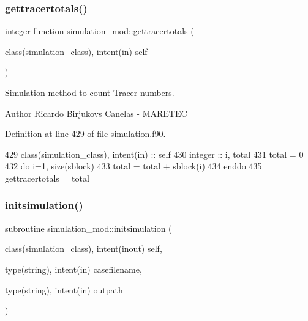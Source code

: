 \subsubsection{\texorpdfstring{gettracertotals()}{gettracertotals()}}
{\footnotesize\ttfamily integer function simulation\+\_\+mod\+::gettracertotals (\begin{DoxyParamCaption}\item[{class(\mbox{\hyperlink{structsimulation__mod_1_1simulation__class}{simulation\+\_\+class}}), intent(in)}]{self }\end{DoxyParamCaption})\hspace{0.3cm}{\ttfamily [private]}}



Simulation method to count Tracer numbers. 

\begin{DoxyAuthor}{Author}
Ricardo Birjukovs Canelas -\/ M\+A\+R\+E\+T\+EC 
\end{DoxyAuthor}


Definition at line 429 of file simulation.\+f90.


\begin{DoxyCode}
429     \textcolor{keywordtype}{class}(simulation\_class), \textcolor{keywordtype}{intent(in)} :: self
430     \textcolor{keywordtype}{integer} :: i, total
431     total = 0
432     \textcolor{keywordflow}{do} i=1, \textcolor{keyword}{size}(sblock)
433         total = total + sblock(i)%
434 \textcolor{keywordflow}{    enddo}
435     gettracertotals = total
\end{DoxyCode}
\mbox{\label{namespacesimulation__mod_aedbba2bb458cbcd7eb93938a5f7b5940}} 
\subsubsection{\texorpdfstring{initsimulation()}{initsimulation()}}
{\footnotesize\ttfamily subroutine simulation\+\_\+mod\+::initsimulation (\begin{DoxyParamCaption}\item[{class(\mbox{\hyperlink{structsimulation__mod_1_1simulation__class}{simulation\+\_\+class}}), intent(inout)}]{self,  }\item[{type(string), intent(in)}]{casefilename,  }\item[{type(string), intent(in)}]{outpath }\end{DoxyParamCaption})\hspace{0.3cm}{\ttfamily [private]}}




